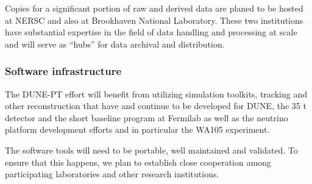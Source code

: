 Copies for a significant portion of raw and derived data are planed to be hosted at NERSC and also at Brookhaven National Laboratory.
These two institutions have substantial expertise  in the field of data handling and processing at scale and will serve as ``hubs'' for data archival and distribution.


\subsubsection{Software infrastructure}

The DUNE-PT effort will benefit from utilizing simulation toolkits, tracking and other reconstruction
that have and continue to be developed for DUNE, the 35 t detector and the short baseline program at Fermilab as well as the 
neutrino platform development efforts and in particular the WA105 experiment.

The software tools will need to be portable, well maintained and validated. To ensure that this happens,
we plan to establish close cooperation among participating laboratories and other research institutions.



